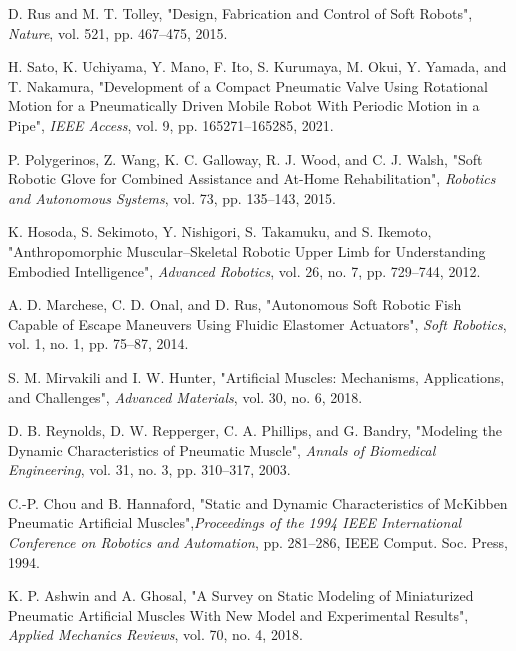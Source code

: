 \documentclass[letterpaper, 10 pt, conference]{IEEEconf}
\begin{document}
 \footnotesize
% 
% 

\begin{thebibliography}{99}

     D. Rus and M. T. Tolley, "Design, Fabrication and Control of Soft Robots", \textit{Nature}, vol. 521, pp. 467--475, 2015.
    
     H. Sato, K. Uchiyama, Y. Mano, F. Ito, S. Kurumaya, M. Okui, Y. Yamada, and T. Nakamura, "Development of a Compact Pneumatic Valve Using Rotational Motion for a Pneumatically Driven Mobile Robot With Periodic Motion in a Pipe", \textit{IEEE Access}, vol. 9, pp. 165271--165285, 2021.
    
     P. Polygerinos, Z. Wang, K. C. Galloway, R. J. Wood, and C. J. Walsh, "Soft Robotic Glove for Combined Assistance and At-Home Rehabilitation", \textit{Robotics and Autonomous Systems}, vol. 73, pp. 135--143, 2015.
    
     K. Hosoda, S. Sekimoto, Y. Nishigori, S. Takamuku, and S. Ikemoto, "Anthropomorphic Muscular–Skeletal Robotic Upper Limb for Understanding Embodied Intelligence", \textit{Advanced Robotics}, vol. 26, no. 7, pp. 729--744, 2012.
    
     A. D. Marchese, C. D. Onal, and D. Rus, "Autonomous Soft Robotic Fish Capable of Escape Maneuvers Using Fluidic Elastomer Actuators", \textit{Soft Robotics}, vol. 1, no. 1, pp. 75--87, 2014.
    
     S. M. Mirvakili and I. W. Hunter, "Artificial Muscles: Mechanisms, Applications, and Challenges", \textit{Advanced Materials}, vol. 30, no. 6, 2018.
    
     D. B. Reynolds, D. W. Repperger, C. A. Phillips, and G. Bandry, "Modeling the Dynamic Characteristics of Pneumatic Muscle", \textit{Annals of Biomedical Engineering}, vol. 31, no. 3, pp. 310--317, 2003.
    
     C.-P. Chou and B. Hannaford, "Static and Dynamic Characteristics of McKibben Pneumatic Artificial Muscles",\textit{Proceedings of the 1994 IEEE International Conference on Robotics and Automation}, pp. 281--286, IEEE Comput. Soc. Press, 1994.
    
     K. P. Ashwin and A. Ghosal, "A Survey on Static Modeling of Miniaturized Pneumatic Artificial Muscles With New Model and Experimental Results", \textit{Applied Mechanics Reviews}, vol. 70, no. 4, 2018.
    

\end{thebibliography}
\end{document}
